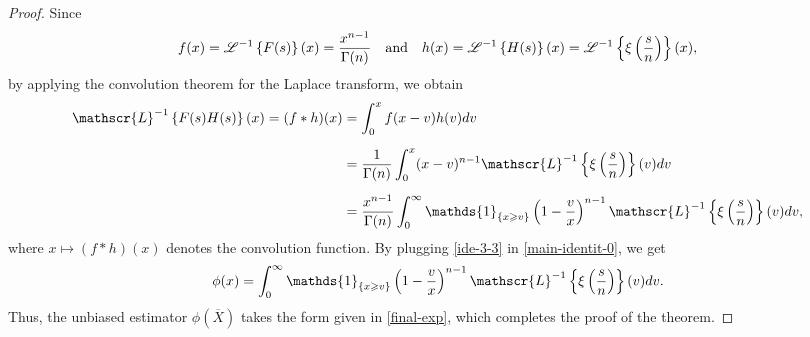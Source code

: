 \documentclass[10pt,a4paper]{amsart}
\begin{document}
\begin{proof}
	Since
	\begin{align*}
		f(x)=  \mathscr{L}^{-1}\left\{	F(s)
		\right\}(x)
		=
		{x^{n-1}\over\Gamma(n)}
		\quad
		\text{and}
		\quad 
		h(x)=\mathscr{L}^{-1}\left\{H(s)
		\right\}(x)
		=
		\mathscr{L}^{-1}\left\{\xi\left({s\over n}\right)
		\right\}(x),
	\end{align*}
	by applying the convolution theorem for the Laplace transform, we obtain
	\begin{align}
		\mathscr{L}^{-1}\left\{	
		F(s) H(s)
		\right\}
		(x)
		=
		(f*h)(x)
		&=
		\int_0^x f(x-v)h(v){\rm d}v
		\nonumber
		\\[0,2cm]
		&=
		{1\over\Gamma(n)}
		\int_0^x (x-v)^{n-1} 
		\mathscr{L}^{-1}\left\{\xi\left({s\over n}\right)
		\right\}(v){\rm d}v
		\label{ide-3-3-1}
		\\[0,2cm]
		&=
		{x^{n-1} \over\Gamma(n)}
		\int_0^\infty 
		\mathds{1}_{\{x\geqslant v\}}
		\left(1-{v\over x}\right)^{n-1} 
		\mathscr{L}^{-1}\left\{\xi\left({s\over n}\right)
		\right\}(v){\rm d}v, \label{ide-3-3}
	\end{align}
	where $x\mapsto(f*h)(x)$ denotes  the convolution function. By plugging \eqref{ide-3-3} in \eqref{main-identit-0}, we get
	\begin{align}
		\phi(x)
		=
		\int_0^\infty 
		\mathds{1}_{\{x\geqslant v\}}
		\left(1-{v\over x}\right)^{n-1} 
		\mathscr{L}^{-1}\left\{\xi\left({s\over n}\right)
		\right\}(v){\rm d}v.
	\end{align}
	Thus, the unbiased estimator $\phi(\overline{X})$ takes the form given in \eqref{final-exp}, which completes the proof of the theorem.
\end{proof}
\end{document}
